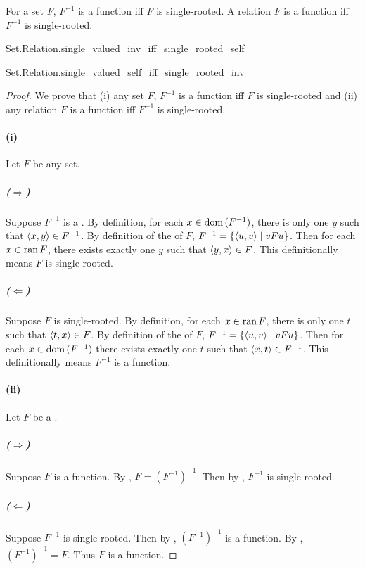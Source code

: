 \documentclass{report}
\begin{document}
  \begin{theorem}[3F]
    For a set $F$, $F^{-1}$ is a function iff $F$ is single-rooted.
    A relation $F$ is a function iff $F^{-1}$ is single-rooted.
  \end{theorem}

    {Set.Relation.single\_valued\_inv\_iff\_single\_rooted\_self}

    {Set.Relation.single\_valued\_self\_iff\_single\_rooted\_inv}

  \begin{proof}
    We prove that (i) any set $F$, $F^{-1}$ is a function iff $F$ is
      single-rooted and (ii) any relation $F$ is a function iff $F^{-1}$ is
      single-rooted.

    \paragraph{(i)}%

      Let $F$ be any set.

      \subparagraph{($\Rightarrow$)}%

        Suppose $F^{-1}$ is a .
        By definition, for each $x \in \mathop{\text{dom}}{(F^{-1})}$, there is only one $y$
          such that $\left< x, y \right> \in F^{-1}$.
        By definition of the  of $F$,
          $F^{-1} = \{\left< u, v \right> \mid vFu\}$.
        Then for each $x \in \mathop{\text{ran}}{F}$, there exists exactly one $y$ such that
          $\left< y, x \right> \in F$.
        This definitionally means $F$ is single-rooted.

      \subparagraph{($\Leftarrow$)}%

        Suppose $F$ is single-rooted.
        By definition, for each $x \in \mathop{\text{ran}}{F}$, there is only one $t$ such that
          $\left< t, x \right> \in F$.
        By definition of the  of $F$,
          $F^{-1} = \{\left< u, v \right> \mid vFu\}$.
        Then for each $x \in \mathop{\text{dom}}{(F^{-1})}$ there exists exactly one $t$ such
          that $\left< x, t \right> \in F^{-1}$.
        This definitionally means $F^{-1}$ is a function.

    \paragraph{(ii)}%

      Let $F$ be a .

      \subparagraph{($\Rightarrow$)}%

        Suppose $F$ is a function.
        By , $F = (F^{-1})^{-1}$.
        Then by , $F^{-1}$ is single-rooted.

      \subparagraph{($\Leftarrow$)}%

        Suppose $F^{-1}$ is single-rooted.
        Then by , $(F^{-1})^{-1}$ is a function.
        By , $(F^{-1})^{-1} = F$.
        Thus $F$ is a function.

  \end{proof}
\end{document}
